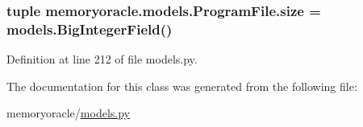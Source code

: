 \subsubsection[{size}]{\setlength{\rightskip}{0pt plus 5cm}tuple memoryoracle.\+models.\+Program\+File.\+size = models.\+Big\+Integer\+Field()\hspace{0.3cm}{\ttfamily [static]}}\label{classmemoryoracle_1_1models_1_1ProgramFile_a81df4da5004a89d6d07ad8d104a67e56}


Definition at line 212 of file models.\+py.



The documentation for this class was generated from the following file\+:\begin{DoxyCompactItemize}
\item 
memoryoracle/\hyperlink{models_8py}{models.\+py}\end{DoxyCompactItemize}
